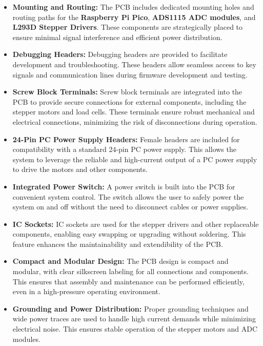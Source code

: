 \begin{itemize}
    \item \textbf{Mounting and Routing:} The PCB includes dedicated mounting holes and routing paths for the \textbf{Raspberry Pi Pico}, \textbf{ADS1115 ADC modules}, and \textbf{L293D Stepper Drivers}. These components are strategically placed to ensure minimal signal interference and efficient power distribution.

    \item \textbf{Debugging Headers:} Debugging headers are provided to facilitate development and troubleshooting. These headers allow seamless access to key signals and communication lines during firmware development and testing.

    \item \textbf{Screw Block Terminals:} Screw block terminals are integrated into the PCB to provide secure connections for external components, including the stepper motors and load cells. These terminals ensure robust mechanical and electrical connections, minimizing the risk of disconnections during operation.

    \item \textbf{24-Pin PC Power Supply Headers:} Female headers are included for compatibility with a standard 24-pin PC power supply. This allows the system to leverage the reliable and high-current output of a PC power supply to drive the motors and other components.

    \item \textbf{Integrated Power Switch:} A power switch is built into the PCB for convenient system control. The switch allows the user to safely power the system on and off without the need to disconnect cables or power supplies.

    \item \textbf{IC Sockets:} IC sockets are used for the stepper drivers and other replaceable components, enabling easy swapping or upgrading without soldering. This feature enhances the maintainability and extendibility of the PCB.

    \item \textbf{Compact and Modular Design:} The PCB design is compact and modular, with clear silkscreen labeling for all connections and components. This ensures that assembly and maintenance can be performed efficiently, even in a high-pressure operating environment.

    \item \textbf{Grounding and Power Distribution:} Proper grounding techniques and wide power traces are used to handle high current demands while minimizing electrical noise. This ensures stable operation of the stepper motors and ADC modules.
\end{itemize}

